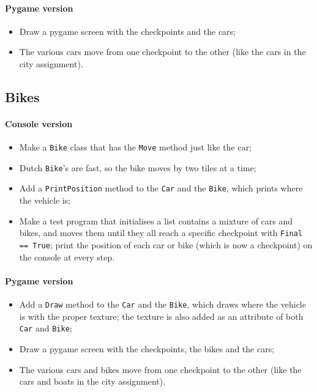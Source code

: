 \documentclass[12pt,a4paper,final]{article}
\begin{document}
			\paragraph*{Pygame version}
			\begin{itemize}
				\item Draw a pygame screen with the checkpoints and the cars;
				\item The various cars move from one checkpoint to the other (like the cars in the city assignment).
			\end{itemize}
			
		\subsection{Bikes}
			\paragraph*{Console version}
			\begin{itemize}
				\item Make a \texttt{Bike} class that has the \texttt{Move} method just like the car;
				\item Dutch \texttt{Bike}'s are fast, so the bike moves by two tiles at a time;
				\item Add a \texttt{PrintPosition} method to the \texttt{Car} and the \texttt{Bike}, which prints where the vehicle is;
				\item Make a test program that initialises a list contains a mixture of cars and bikes, and moves them until they all reach a specific checkpoint with \texttt{Final == True}; print the position of each car or bike (which is now a checkpoint) on the console at every step.
			\end{itemize}
			
			\paragraph*{Pygame version}
			\begin{itemize}
				\item Add a \texttt{Draw} method to the \texttt{Car} and the \texttt{Bike}, which draws where the vehicle is with the proper texture; the texture is also added as an attribute of both \texttt{Car} and \texttt{Bike};
				\item Draw a pygame screen with the checkpoints, the bikes and the cars;
				\item The various cars and bikes move from one checkpoint to the other (like the cars and boats in the city assignment).
			\end{itemize}
			
\end{document}
